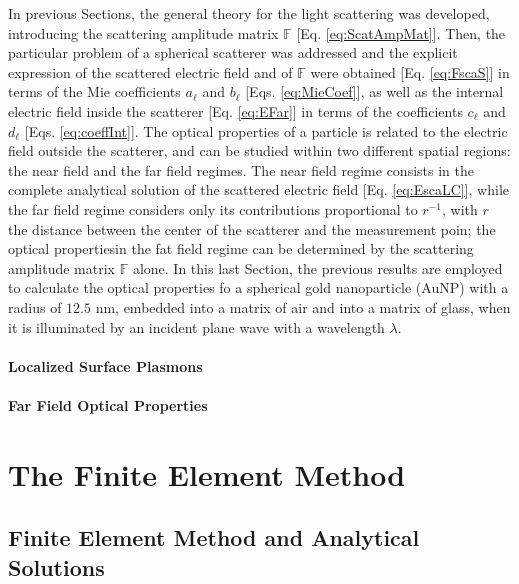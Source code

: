 \documentclass[11pt]{Latex/Classes/PhDthesisPSnPDF}
\begin{document}
         In previous Sections, the general theory for the light scattering was developed, introducing the scattering amplitude matrix $\mathbb{F}$ [Eq. \eqref{eq:ScatAmpMat}]. Then, the particular problem of a spherical scatterer was addressed and the explicit expression of the scattered electric field and of $\mathbb{F}$ were obtained [Eq. \eqref{eq:FscaS}] in terms of the Mie coefficients $a_\ell$ and  $b_\ell$ [Eqs. \eqref{eq:MieCoef}], as well as the internal electric field inside the scatterer [Eq. \eqref{eq:EFar}] in terms of the coefficients $c_\ell$ and $d_\ell$ [Eqs. \eqref{eq:coeffInt}]. The  optical properties of a particle is related to the electric field outside the scatterer,  and can be studied within two different spatial regions: the near field and the far field regimes. The near field regime consists in the complete analytical solution of the scattered electric field [Eq. \eqref{eq:EscaLC}], while the far field regime considers only its contributions proportional to $r^{-1}$, with $r$ the distance between the center of the scatterer and the measurement poin; the optical propertiesin the fat field regime can be determined by the scattering amplitude matrix $\mathbb{F}$ alone.  In this last Section, the previous results are employed to calculate the optical properties fo  a spherical gold nanoparticle (AuNP) with a radius of $12.5$ nm, embedded into a matrix of air and into a matrix of glass, when it is illuminated by an incident plane wave with a wavelength $\lambda$.

            \subsubsection{Localized Surface Plasmons}
             \label{sss:LSPR}
             

            \subsubsection{Far Field Optical Properties}
             \label{sss:FarField}
             


\chapter{The Finite Element Method}
\label{chapter:FEM}



	\section{Finite Element Method and Analytical Solutions}
		\label{sec:FEM-Mie}
		
\end{document}
